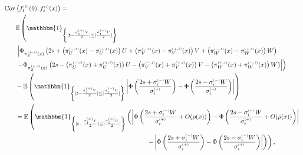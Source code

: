\documentclass[12pt]{article}
\theoremstyle{Theorem}
\begin{document}
{\small
\begin{align*}
 \text{Cov}\left(f_{t}^{\scriptscriptstyle(1)}(0), f_{s}^{\scriptscriptstyle(i)}(x) \right) & =  \\ 
 & \hspace{-2.5cm} \mathbb{E}\left(\mathbbm{1}_{\left\{ |t - \frac{\sigma^{\scriptscriptstyle (+)}_{1}V}{2}| \leq |\frac{\sigma^{\scriptscriptstyle (-)}_{1}U}{2}|\right\}}\right. \\
&\hspace{-2.5cm} \left. \left|\Phi_{ \pi^{\scriptscriptstyle(+, i)}_{Z}(x)}\left( 2s + \left( \pi^{\scriptscriptstyle(-, i)}_{U}(x)- \pi^{\scriptscriptstyle(+, i)}_{U}(x)\right) U + \left(\pi^{\scriptscriptstyle(-, i)}_{V}(x)- \pi^{\scriptscriptstyle(+, i)}_{V}(x)\right)V + \left(\pi^{\scriptscriptstyle(-, i)}_{W}(x) - \pi^{\scriptscriptstyle(+, i)}_{W}(x)\right) W \right) \right. \right.  \nonumber \\
& \hspace{-2.5cm}\left. \left.  - \Phi_{ \pi^{\scriptscriptstyle(+, i)}_{Z}(x)}\left( 2s - \left( \pi^{\scriptscriptstyle(-, i)}_{U}(x)+ \pi^{\scriptscriptstyle(+, i)}_{U}(x)\right) U - \left(\pi^{\scriptscriptstyle(-, i)}_{V}(x)+ \pi^{\scriptscriptstyle(+, i)}_{V}(x)\right)V   - \left( \pi^{\scriptscriptstyle(+, i)}_{W}(x) +  \pi^{\scriptscriptstyle(-, i)}_{W}(x) \right)W \right)  \right| \right) \\
& \hspace{-2.5cm} - \mathbb{E}\left(\mathbbm{1}_{\left\{ |t - \frac{\sigma^{\scriptscriptstyle (+)}_{1}V}{2}| \leq |\frac{\sigma^{\scriptscriptstyle (-)}_{1}U}{2}|\right\}}\left|\Phi\left(\frac{2s + \sigma^{\scriptscriptstyle (-)}_{i}W}{\sigma^{\scriptscriptstyle (+)}_{i}} \right) - \Phi\left(\frac{2s -\sigma^{\scriptscriptstyle (-)}_{i}W }{\sigma^{\scriptscriptstyle (+)}_{i}} \right)\right|\right)\\
& \hspace{-2.5cm} = \mathbb{E}\left(\mathbbm{1}_{\left\{ |t - \frac{\sigma^{\scriptscriptstyle (+)}_{1}V}{2}| \leq |\frac{\sigma^{\scriptscriptstyle (-)}_{1}U}{2}|\right\}} \left(\left|\Phi\left(\frac{2s + \sigma^{\scriptscriptstyle (-)}_{i}W}{\sigma^{\scriptscriptstyle (+)}_{i}} + O(\rho(x)) \right) - \Phi\left(\frac{2s -\sigma^{\scriptscriptstyle (-)}_{i}W }{\sigma^{\scriptscriptstyle (+)}_{i}} + O(\rho(x))\right)\right| \right. \right. \\
& \hspace{4.75cm} \left.\left. -  \left|\Phi\left(\frac{2s + \sigma^{\scriptscriptstyle (-)}_{i}W}{\sigma^{\scriptscriptstyle (+)}_{i}} \right) - \Phi\left(\frac{2s -\sigma^{\scriptscriptstyle (-)}_{i}W }{\sigma^{\scriptscriptstyle (+)}_{i}} \right)\right| \right)\right),
\end{align*}
}
\end{document}
